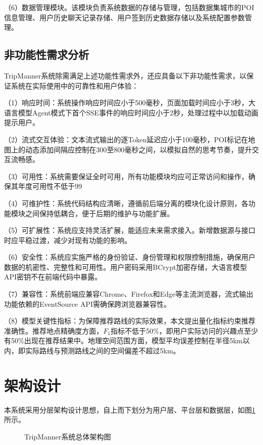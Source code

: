 （6）数据管理模块。该模块负责系统数据的存储与管理，包括数据集城市的POI信息管理、用户历史聊天记录存储、用户签到历史数据存储以及系统配置参数管理。

\subsection{非功能性需求分析}
\label{sec:ch5_nonfunc_req}

TripManner系统除需满足上述功能性需求外，还应具备以下非功能性需求，以保证系统在实际使用中的可靠性和用户体验：

（1）响应时间：系统操作响应时间应小于500毫秒，页面加载时间应小于3秒，大语言模型Agent模式下首个SSE事件的响应时间应小于2秒，处理过程中以加载动画提示用户。

（2）流式交互体验：文本流式输出的逐Token延迟应小于100毫秒，POI标记在地图上的动态添加间隔应控制在300至800毫秒之间，以模拟自然的思考节奏，提升交互流畅感。

（3）可用性：系统需要保证全时可用，所有功能模块均应可正常访问和操作，确保其年度可用性不低于99%

（4）可维护性：系统代码结构应清晰，遵循前后端分离的模块化设计原则，各功能模块之间保持低耦合，便于后期的维护与功能扩展。

（5）可扩展性：系统应支持灵活扩展，能适应未来需求接入。新增数据源与接口时应平稳过渡，减少对现有功能的影响。

（6）安全性：系统应实施严格的身份验证、身份管理和权限控制措施，确保用户数据的机密性、完整性和可用性。用户密码采用BCrypt加密存储，大语言模型API密钥不在前端代码中暴露。

（7）兼容性：系统前端应兼容Chrome、Firefox和Edge等主流浏览器，流式输出功能依赖的EventSource API需确保跨浏览器兼容性。

（8）模型关键性指标：为保障推荐路线的实际效果，本文提出量化指标约束推荐准确性。推荐地点精确度方面，$F_1$指标不低于50\%，即用户实际访问的兴趣点至少有50\%出现在推荐结果中。地理空间范围方面，模型平均误差控制在半径5km以内，即实际路线与预测路线之间的空间偏差不超过5km。

\section{架构设计}
\label{sec:ch5_architecture}

本系统采用分层架构设计思想，自上而下划分为用户层、平台层和数据层，如图\ref{fig:ch5_arch}所示。

\begin{figure}[hbt]
  \centering
  \caption{TripManner系统总体架构图}
  \label{fig:ch5_arch}
\end{figure}

